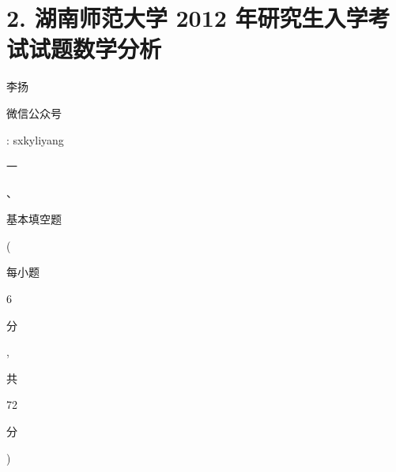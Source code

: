\documentclass[10pt]{article}
\begin{document}
\section{2. 湖南师范大学 2012 年研究生入学考试试题数学分析}
\begin{CJK}{UTF8}{mj}李扬\end{CJK}

\begin{CJK}{UTF8}{mj}微信公众号\end{CJK}: sxkyliyang

\begin{CJK}{UTF8}{mj}一\end{CJK}、\begin{CJK}{UTF8}{mj}基本填空题\end{CJK}(\begin{CJK}{UTF8}{mj}每小题\end{CJK} 6 \begin{CJK}{UTF8}{mj}分\end{CJK}, \begin{CJK}{UTF8}{mj}共\end{CJK} 72 \begin{CJK}{UTF8}{mj}分\end{CJK})
\end{document}
